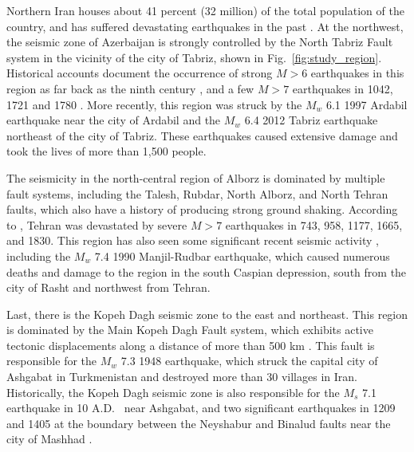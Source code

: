 Northern Iran houses about 41 percent (32 million) of the total population of the country, and has suffered devastating earthquakes in the past \citep[e.g.,][]{Mehrain_1990_Tech, Chafory-Ashtiany_1999_DPM, Razzaghi_2012_Tech}. At the northwest, the seismic zone of Azerbaijan is strongly controlled by the North Tabriz Fault system in the vicinity of the city of Tabriz, shown in Fig.~\ref{fig:study_region}. Historical accounts document the occurrence of strong $M>6$ earthquakes in this region as far back as the ninth century \citep{Berberian1999}, and a few $M>7$ earthquakes in 1042, 1721 and 1780 \citep{Jones1834}. More recently, this region was struck by the $M_w$ 6.1 1997 Ardabil earthquake near the city of Ardabil and the $M_w$ 6.4 2012 Tabriz earthquake northeast of the city of Tabriz. These earthquakes caused extensive damage and took the lives of more than 1,500 people. 

The seismicity in the north-central region of Alborz is dominated by multiple fault systems, including the Talesh, Rubdar, North Alborz, and North Tehran faults, which also have a history of producing strong ground shaking. According to \citet{Ambraseys_1982_Book}, Tehran was devastated by severe $M>7$ earthquakes in 743, 958, 1177, 1665, and 1830. This region has also seen some significant recent seismic activity \citep{Berberian1999}, including the $M_w$ 7.4 1990 Manjil-Rudbar earthquake, which caused numerous deaths and damage to the region in the south Caspian depression, south from the city of Rasht and northwest from Tehran. 

Last, there is the Kopeh Dagh seismic zone to the east and northeast. This region is dominated by the Main Kopeh Dagh Fault system, which exhibits active tectonic displacements along a distance of more than 500 km \citep{Trifonov1978}. This fault is responsible for the $M_w$ 7.3 1948 earthquake, which struck the capital city of Ashgabat in Turkmenistan and destroyed more than 30 villages in Iran. Historically, the Kopeh Dagh seismic zone is also responsible for the $M_s$ 7.1 earthquake in 10 A.D.~\citep{Berberian2001} near Ashgabat, and two significant earthquakes in 1209 and 1405 at the boundary between the Neyshabur and Binalud faults near the city of Mashhad \citep{Berberian1999}.

